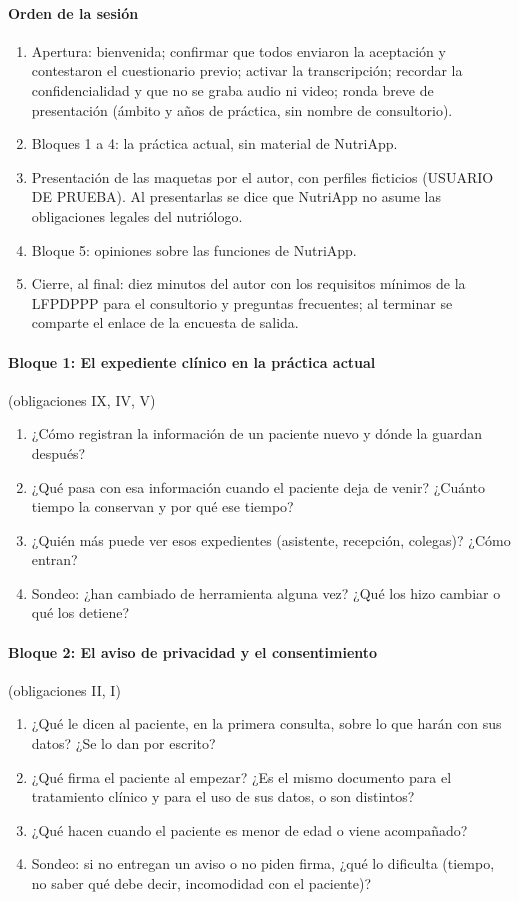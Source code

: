 \documentclass[12pt, a4paper]{article}
\begin{document}
\paragraph{Orden de la sesión}
\begin{enumerate}
  \item Apertura: bienvenida; confirmar que todos enviaron la aceptación y contestaron el cuestionario previo; activar la transcripción; recordar la confidencialidad y que no se graba audio ni video; ronda breve de presentación (ámbito y años de práctica, sin nombre de consultorio).
  \item Bloques 1 a 4: la práctica actual, sin material de NutriApp.
  \item Presentación de las maquetas por el autor, con perfiles ficticios (USUARIO DE PRUEBA). Al presentarlas se dice que NutriApp no asume las obligaciones legales del nutriólogo.
  \item Bloque 5: opiniones sobre las funciones de NutriApp.
  \item Cierre, al final: diez minutos del autor con los requisitos mínimos de la LFPDPPP para el consultorio y preguntas frecuentes; al terminar se comparte el enlace de la encuesta de salida.
\end{enumerate}
\paragraph{Bloque 1: El expediente clínico en la práctica actual} (obligaciones IX, IV, V)
\begin{enumerate}
  \item ¿Cómo registran la información de un paciente nuevo y dónde la guardan después?
  \item ¿Qué pasa con esa información cuando el paciente deja de venir? ¿Cuánto tiempo la conservan y por qué ese tiempo?
  \item ¿Quién más puede ver esos expedientes (asistente, recepción, colegas)? ¿Cómo entran?
  \item Sondeo: ¿han cambiado de herramienta alguna vez? ¿Qué los hizo cambiar o qué los detiene?
\end{enumerate}
 
\paragraph{Bloque 2: El aviso de privacidad y el consentimiento} (obligaciones II, I)
\begin{enumerate}
  \item ¿Qué le dicen al paciente, en la primera consulta, sobre lo que harán con sus datos? ¿Se lo dan por escrito?
  \item ¿Qué firma el paciente al empezar? ¿Es el mismo documento para el tratamiento clínico y para el uso de sus datos, o son distintos?
  \item ¿Qué hacen cuando el paciente es menor de edad o viene acompañado?
  \item Sondeo: si no entregan un aviso o no piden firma, ¿qué lo dificulta (tiempo, no saber qué debe decir, incomodidad con el paciente)?
\end{enumerate}
 
\end{document}
